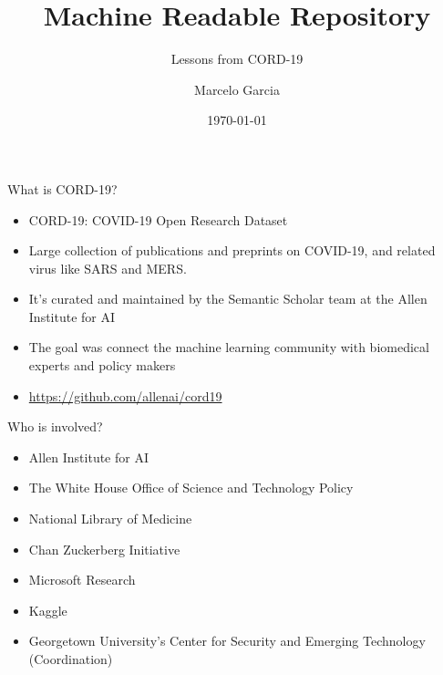 \documentclass[aspectratio=169]{beamer}
\title{Machine Readable Repository}
\subtitle{Lessons from CORD-19}
\author{Marcelo Garcia}
\institute{KAUST University Library}
\date{\today}
\begin{document}
\begin{frame}
\titlepage
\end{frame}

\begin{frame}{What is CORD-19?}
    \begin{itemize}
        \item CORD-19: COVID-19 Open Research Dataset
        \item Large collection of publications and preprints on COVID-19, and related virus like SARS and MERS.
        \item It's curated and maintained by the Semantic Scholar team at the Allen Institute for AI
        \item The goal was connect the machine learning community with biomedical experts and policy makers    
        \item \href{https://github.com/allenai/cord19}{https://github.com/allenai/cord19}
    \end{itemize}
\end{frame}

\begin{frame}{Who is involved?}
    \begin{itemize}
        \item Allen Institute for AI
        \item The White House Office of Science and Technology Policy
        \item National Library of Medicine
        \item Chan Zuckerberg Initiative
        \item Microsoft Research
        \item Kaggle
        \item Georgetown University's Center for Security and Emerging Technology (Coordination)
    \end{itemize}
\end{frame}
\end{document}
